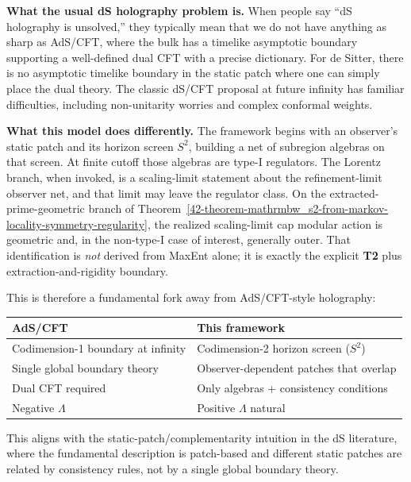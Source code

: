 \textbf{What the usual dS holography problem is.} When people say ``dS holography is unsolved,'' they typically mean that we do not have anything as sharp as AdS/CFT, where the bulk has a timelike asymptotic boundary supporting a well-defined dual CFT with a precise dictionary. For de Sitter, there is no asymptotic timelike boundary in the static patch where one can simply place the dual theory. The classic dS/CFT proposal at future infinity has familiar difficulties, including non-unitarity worries and complex conformal weights.

\textbf{What this model does differently.} The framework begins with an observer's static patch and its horizon screen \(S^2\), building a net of subregion algebras on that screen. At finite cutoff those algebras are type-I regulators. The Lorentz branch, when invoked, is a scaling-limit statement about the refinement-limit observer net, and that limit may leave the regulator class. On the extracted-prime-geometric branch of Theorem~\ref{42-theorem-mathrmbw_s2-from-markov-locality-symmetry-regularity}, the realized scaling-limit cap modular action is geometric and, in the non-type-I case of interest, generally outer. That identification is \emph{not} derived from MaxEnt alone; it is exactly the explicit \textbf{T2} plus extraction-and-rigidity boundary.

This is therefore a fundamental fork away from AdS/CFT-style holography:

{\def\LTcaptype{none}
\begin{longtable}[]{@{}>{\RaggedRight\arraybackslash}p{}>{\RaggedRight\arraybackslash}p{}@{}}
\toprule\noalign{}
AdS/CFT & This framework \\
\midrule\noalign{}
\endhead
\bottomrule\noalign{}
\endlastfoot
Codimension-1 boundary at infinity & Codimension-2 horizon screen (\(S^2\)) \\
Single global boundary theory & Observer-dependent patches that overlap \\
Dual CFT required & Only algebras + consistency conditions \\
Negative \(\Lambda\) & Positive \(\Lambda\) natural \\
\end{longtable}
}

This aligns with the static-patch/complementarity intuition in the dS literature, where the fundamental description is patch-based and different static patches are related by consistency rules, not by a single global boundary theory.

